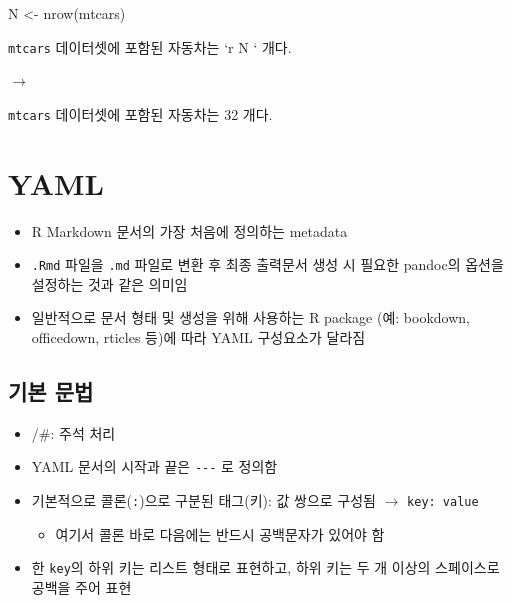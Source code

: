 \documentclass[
  11pt,
]{krantz}
\newenvironment{Shaded}{\begin{snugshade}}{\end{snugshade}}
\newcommand{\FunctionTok}[1]{\textcolor[rgb]{0,0,0}{#1}}
\newcommand{\NormalTok}[1]{#1}
\newcommand{\OtherTok}[1]{\textcolor[rgb]{0.37,0.37,0.37}{#1}}
\providecommand{\tightlist}{%
  \setlength{\itemsep}{0pt}\setlength{\parskip}{0pt}}
\begin{document}
\begin{Shaded}
\begin{Highlighting}[]
\NormalTok{N }\OtherTok{\textless{}{-}} \FunctionTok{nrow}\NormalTok{(mtcars)}
\end{Highlighting}
\end{Shaded}

\normalsize

\texttt{mtcars} 데이터셋에 포함된 자동차는 {`}r N ` 개다.

\(\rightarrow\)

\texttt{mtcars} 데이터셋에 포함된 자동차는 32 개다.

\hypertarget{yaml}{%
\section{YAML}\label{yaml}}

\begin{itemize}
\tightlist
\item
  R Markdown 문서의 가장 처음에 정의하는 metadata
\item
  \texttt{.Rmd} 파일을 \texttt{.md} 파일로 변환 후 최종 출력문서 생성 시 필요한 pandoc의 옵션을 설정하는 것과 같은 의미임
\item
  일반적으로 문서 형태 및 생성을 위해 사용하는 R package (예: bookdown, officedown, rticles 등)에 따라 YAML 구성요소가 달라짐
\end{itemize}

\hypertarget{basic-syntax}{%
\subsection*{기본 문법}\label{basic-syntax}}


\begin{itemize}
\tightlist
\item
  /\#: 주석 처리
\item
  YAML 문서의 시작과 끝은 \texttt{-\/-\/-} 로 정의함
\item
  기본적으로 콜론(\texttt{:})으로 구분된 태그(키): 값 쌍으로 구성됨 \(\rightarrow\) \texttt{key:\ value}

  \begin{itemize}
  \tightlist
  \item
    여기서 콜론 바로 다음에는 반드시 공백문자가 있어야 함
  \end{itemize}
\item
  한 \texttt{key}의 하위 키는 리스트 형태로 표현하고, 하위 키는 두 개 이상의 스페이스로 공백을 주어 표현
\end{itemize}
\end{document}
